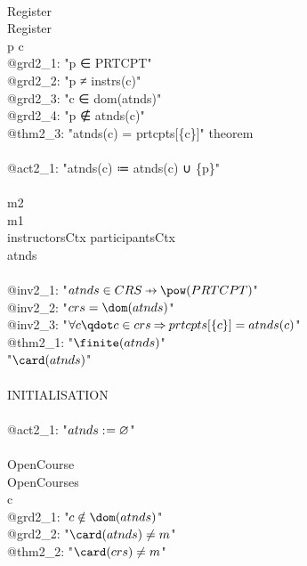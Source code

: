 \begin{description}
\begin{center}
\begin{Bcode}
      \Bend\\
      Register \Bconvergent\\
      \Brefines{} Register\\
      \Bany{} p c \Bwhere\\
      @grd2_1: "p ∈ PRTCPT"\\
      @grd2_2: "p ≠ instrs(c)"\\
      @grd2_3: "c ∈ dom(atnds)"\\
      @grd2_4: "p ∉ atnds(c)"\\
      @thm2_3: "atnds(c) = prtcpts[\{c\}]" theorem\\
      \Bthen\\
      @act2_1: "atnds(c) ≔ atnds(c) ∪ \{p\}"\\
      \Bend\\
      \Bend
      \else
      \Bmachine{} m2\\
      \Brefines{} m1\\
      \Bsees{} instructorsCtx participantsCtx\\
      \Bvariables{} atnds\\
      \Binvariants\\
      \Btab @inv2_1: "\(atnds \in CRS \pfun \pow(PRTCPT)\)"\\
      \Btab @inv2_2: "\(crs = \dom(atnds)\)"\\
      \Btab @inv2_3: "\(\forall c \qdot c \in crs \limp prtcpts[\{c\}] = atnds(c)\)"\\
      \Btab @thm2_1: "\(\finite(atnds)\)" \Btheorem\\
      \Bvariant{} "\(\card(atnds)\)"\\
      \Bevents\\
      \Btab INITIALISATION\\
      \Btab \Bbegin\\
      \Btab \Btab @act2_1: "\(atnds \mathrel{:\mkern1mu=} \mathord\varnothing\)"\\
      \Btab \Bend\\
      \Btab OpenCourse\\
      \Btab \Brefines{} OpenCourses\\
      \Btab \Bany{} c \Bwhere\\
      \Btab \Btab @grd2_1: "\(c \notin \dom(atnds)\)"\\
      \Btab \Btab @grd2_2: "\(\card(atnds) \neq m\)" \\
      \Btab \Btab @thm2_2: "\(\card(crs) \neq m\)" \Btheorem\\
      \Btab \Bwith\\

\end{Bcode}
\end{center}
\end{description}
